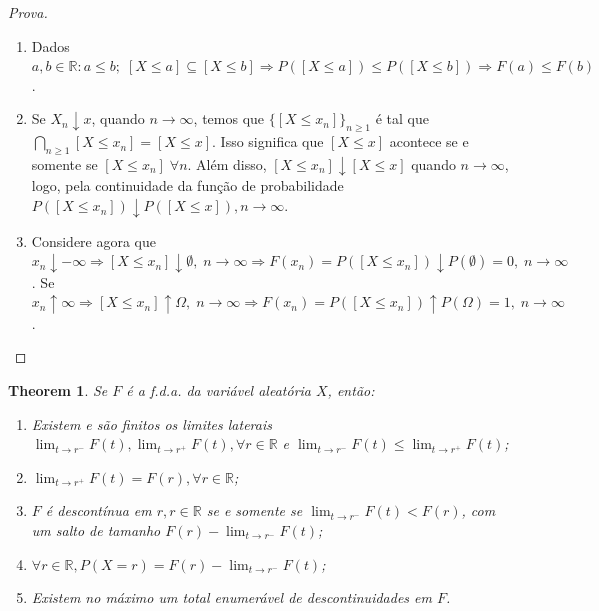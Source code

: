\documentclass[
]{article}
\newtheorem{theorem}{Theorem}[section]
\theoremstyle{definition}
\theoremstyle{definition}
\theoremstyle{definition}
\theoremstyle{definition}
\theoremstyle{remark}
\begin{document}
\begin{proof}[Prova]
\leavevmode

\begin{enumerate}
\def\labelenumi{\alph{enumi})}
\item
  Dados \(a,b \in \mathbb{R} : a \le b; \; [X \le a] \subseteq [X \le b] \Rightarrow P([X \le a]) \le P([X \le b]) \Rightarrow F(a) \le F(b)\).
\item
  Se \(X_{n}\downarrow x\), quando \(n \to \infty\), temos que \(\{[X \le x_{n}]\}_{n \ge 1}\) é tal que \(\bigcap_{n \ge 1}[X \le x_{n}] = [X \le x]\). Isso significa que \([X \le x]\) acontece se e somente se \([X \le x_{n}] \; \forall n\). Além disso, \([X \le x_{n}] \downarrow [X \le x]\) quando \(n \to \infty\), logo, pela continuidade da função de probabilidade \(P([X \le x_{n}]) \downarrow P([X \le x]), n \to \infty\).
\item
  Considere agora que \(x_{n} \downarrow -\infty \Rightarrow [X \le x_{n}] \downarrow \emptyset, \; n \to \infty \Rightarrow F(x_{n}) = P([X \le x_{n}]) \downarrow P(\emptyset) = 0, \; n \to \infty\).
  Se \(x_{n} \uparrow \infty \Rightarrow [X \le x_{n}] \uparrow \Omega, \; n \to \infty \Rightarrow F(x_{n}) = P([X \le x_{n}]) \uparrow P(\Omega) = 1, \; n \to \infty\).
\end{enumerate}

\end{proof}

\begin{theorem}

Se \(F\) é a f.d.a. da variável aleatória \(X\), então:

\begin{enumerate}
\def\labelenumi{\alph{enumi})}
\item
  Existem e são finitos os limites laterais \(\lim_{t \to r^{-}}F(t), \lim_{t \to r^{+}}F(t), \forall r \in \mathbb{R}\) e \(\lim_{t \to r^{-}}F(t) \le \lim_{t \to r^{+}}F(t)\);
\item
  \(\lim_{t \to r^{+}}F(t) = F(r), \forall r \in \mathbb{R}\);
\item
  \(F\) é descontínua em \(r, r \in \mathbb{R}\) se e somente se \(\lim_{t \to r^{-}}F(t) < F(r)\), com um salto de tamanho \(F(r) - \lim_{t \to r^{-}}F(t)\);
\item
  \(\forall r \in \mathbb{R}, P(X = r) = F(r) - \lim_{t \to r^{-}}F(t)\);
\item
  Existem no máximo um total enumerável de descontinuidades em \(F\).
\end{enumerate}

\end{theorem}
\end{document}

